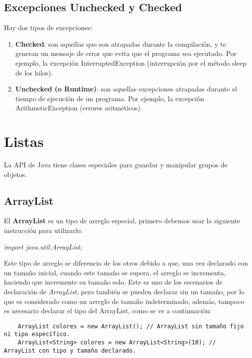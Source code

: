 \subsection{Excepciones Unchecked y Checked}

Hay dos tipos de excepciones:
\begin{enumerate}
    \item \textbf{Checked}: son aquellas que son atrapadas durante la compilación, y te generan un mensaje de error que evita que el programa sea ejecutado. Por ejemplo, la excepción InterruptedException (interrupción por el método sleep de los hilos).
    \item \textbf{Unchecked (o Runtime)}: son aquellas excepciones atrapadas durante el tiempo de ejecución de un programa. Por ejemplo, la excepción ArithmeticException (errores aritméticos).
\end{enumerate}



\section{Listas}

La API de Java tiene clases especiales para guardar y manipular grupos de objetos.


\subsection{ArrayList}

El \textbf{ArrayList} es un tipo de arreglo especial, primero debemos usar la siguiente instrucción para utilizarlo:
\begin{center}
    \textit{import java.util.ArrayList;}
\end{center}

Este tipo de arreglo se diferencia de los otros debido a que, una vez declarado con un tamaño inicial, cuando este tamaño se supera, el arreglo se incrementa, haciendo que incremente su tamaño solo. Este es uno de los escenarios de declaración de \textit{ArrayList}, pero también se pueden declarar sin un tamaño, por lo que es considerado como un arreglo de tamaño indeterminado, además, tampoco es necesario declarar el tipo del ArrayList, como se ve a continuación:
\begin{lstlisting}
    ArrayList colores = new ArrayList(); // ArrayList sin tamaño fijo ni tipo específico.
    ArrayList<String> colores = new ArrayList<String>(10); // ArrayList con tipo y tamaño declarado.
\end{lstlisting}

